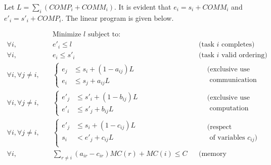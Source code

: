 \documentclass[sigconf]{acmart}
\begin{document}
	
	
	
	
	
	\noindent Let $L=\sum_i (COMP_i + COMM_i)$. It is evident that $e_i =s_i + COMM_i$ and $e'_i =s'_i + COMP_i$. The linear program is given below.
	
	\vspace*{-0.5cm}
	\begin{align*}
		& \text{Minimize $l$ subject to:}\\
		\forall i, \quad & e'_i \leq l && \text{(task $i$ completes)}\\
		\forall i, \quad & e_i \leq s'_i&& \text{(task $i$ valid ordering)}\\
		\forall i, \forall j\ne i, \quad & \left\{\begin{aligned}
			e_j & \leq s_i +(1-a_{ij})L\\
			e_i & \leq s_j +a_{ij}L 
		\end{aligned} \right. &&
		\begin{aligned}
			&\text{(exclusive use of}\\
			&\text{  communication link)}
		\end{aligned}\\
		\forall i, \forall j\ne i, \quad & \left\{
		\begin{aligned}
			e'_j &\leq s'_i +(1-b_{ij})L\\
			e'_i &\leq s'_j +b_{ij}L
		\end{aligned}\right. && 
		\begin{aligned}
			&\text{(exclusive use of}\\
			&\text{  computation resource)}
		\end{aligned}\\
		\forall i, \forall j\ne i, \quad &\left\{
		\begin{aligned}
			e'_j &\leq s_i +(1-c_{ij})L\\
			s_i  &< e'_j +c_{ij}L\\
		\end{aligned}\right.&&
		\begin{aligned}
			&\text{(respect ordering}\\
			&\text{ of variables $c_{ij}$)}
		\end{aligned}\\
		\forall i, \quad & \sum_{r\ne i} (a_{ir} - c_{ir})MC(r) + MC(i) \le C && \text{(memory constraint)}\\
	\end{align*} 
	
\end{document}
